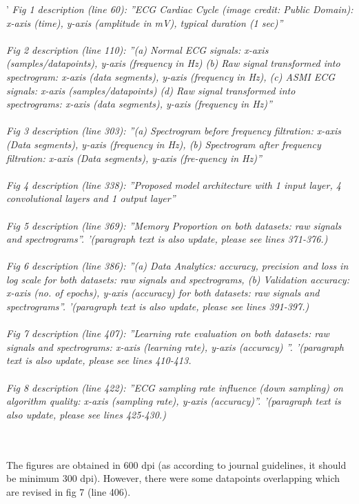 \documentclass{article}
\begin{document}
'\textit{
Fig 1 description (line 60): ''ECG Cardiac Cycle (image credit: Public Domain): x-axis (time), y-axis (amplitude in mV),     typical duration (1 sec)''\\\\
Fig 2 description  (line 110): ''(a) Normal ECG signals: x-axis (samples/datapoints), y-axis (frequency in Hz) (b) Raw signal transformed into spectrogram: x-axis (data segments), y-axis (frequency in Hz), (c) ASMI ECG signals: x-axis (samples/datapoints) (d) Raw signal transformed into spectrograms: x-axis (data segments), y-axis (frequency in Hz)''\\\\
Fig 3 description  (line 303): ''(a) Spectrogram before frequency filtration: x-axis (Data segments), y-axis (frequency in Hz), (b) Spectrogram after frequency filtration: x-axis (Data segments), y-axis (fre-quency in Hz)''\\\\
Fig 4 description  (line 338): ''Proposed model architecture with 1 input layer, 4 convolutional layers and 1 output layer''\\\\
Fig 5 description  (line 369): ''Memory Proportion on both datasets: raw signals and spectrograms''. '\textit{(paragraph text is also update, please see lines 371-376.)} \\\\
Fig 6 description (line 386): ''(a) Data Analytics: accuracy, precision and loss in log scale for both datasets: raw signals and spectrograms, (b) Validation accuracy: x-axis (no. of epochs), y-axis (accuracy) for both datasets: raw signals and spectrograms''. '\textit{(paragraph text is also update, please see lines 391-397.)}\\\\
Fig 7 description (line 407): ''Learning rate evaluation on both datasets: raw signals and spectrograms: x-axis (learning rate), y-axis (accuracy) ''. '\textit{(paragraph text is also update, please see lines 410-413.}\\\\
Fig 8 description (line 422): ''ECG sampling rate influence (down sampling) on algorithm quality: x-axis (sampling rate), y-axis (accuracy)''. '\textit{(paragraph text is also update, please see lines 425-430.)}\\\\\\
}

The figures are obtained in 600 dpi (as according to journal guidelines, it should be minimum 300 dpi). However, there were some datapoints overlapping which are revised in fig 7 (line 406). 
\end{document}
